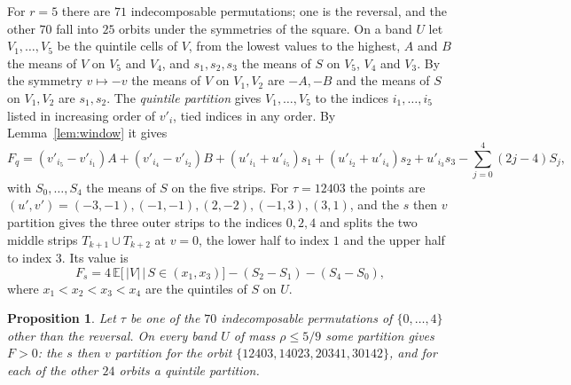 \documentclass[11pt]{amsart}
\newtheorem{proposition}[theorem]{Proposition}
\theoremstyle{definition}
\theoremstyle{remark}
\numberwithin{equation}{section}
\newcommand{\E}{\mathbb{E}}
\begin{document}
For $r=5$ there are $71$ indecomposable permutations; one is the reversal, and the other $70$ fall into $25$ orbits under
the symmetries of the square. On a band $U$ let $V_1,\dots,V_5$ be the quintile cells of $V$, from the lowest values to the
highest, $A$ and $B$ the means of $V$ on $V_5$ and $V_4$, and $s_1,s_2,s_3$ the means of $S$ on $V_5$, $V_4$ and $V_3$. By
the symmetry $v\mapsto-v$ the means of $V$ on $V_1,V_2$ are $-A,-B$ and the means of $S$ on $V_1,V_2$ are $s_1,s_2$. The
\emph{quintile partition} gives $V_1,\dots,V_5$ to the indices $i_1,\dots,i_5$ listed in increasing order of $v'_i$, tied
indices in any order. By Lemma~\ref{lem:window} it gives
\[
F_q=(v'_{i_5}-v'_{i_1})A+(v'_{i_4}-v'_{i_2})B+(u'_{i_1}+u'_{i_5})s_1+(u'_{i_2}+u'_{i_4})s_2+u'_{i_3}s_3
-\sum_{j=0}^{4}(2j-4)S_j,
\]
with $S_0,\dots,S_4$ the means of $S$ on the five strips. For $\tau=12403$ the points are
$(u',v')=(-3,-1),(-1,-1),(2,-2),(-1,3),(3,1)$, and the $s$ then $v$ partition gives the three outer strips to the indices
$0,2,4$ and splits the two middle strips $T_{k+1}\cup T_{k+2}$ at $v=0$, the lower half to index $1$ and the upper half to
index $3$. Its value is
\[
F_s=4\,\E\bigl[\,|V|\,\big|\,S\in(x_1,x_3)\bigr]-(S_2-S_1)-(S_4-S_0),
\]
where $x_1<x_2<x_3<x_4$ are the quintiles of $S$ on $U$.

\begin{proposition}\label{prop:r5}
Let $\tau$ be one of the $70$ indecomposable permutations of $\{0,\dots,4\}$ other than the reversal. On every band $U$ of
mass $\rho\le5/9$ some partition gives $F>0$: the $s$ then $v$ partition for the orbit
$\{12403,14023,20341,30142\}$, and for each of the other $24$ orbits a quintile partition.
\end{proposition}
\end{document}
